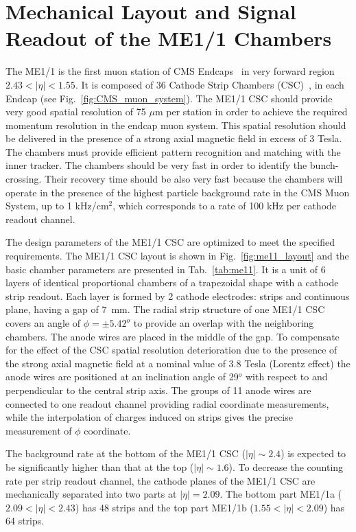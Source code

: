 \section{Mechanical Layout and Signal Readout of the ME1/1 Chambers}
\label{app:me11}

The ME1/1 is the first muon station of CMS Endcaps~\cite{CMS:1997dma} in very forward region $2.43 < |\eta| < 1.55$. It is composed of $36$ Cathode Strip Chambers (CSC)~\cite{Acosta:2000ty, Ershov:2006sf}, in each Endcap (see Fig.~\ref{fig:CMS_muon_system}). The ME1/1 CSC should provide very good spatial resolution of 75 $\mu$m per station in order to achieve the required momentum resolution in the endcap muon system. This spatial resolution should be delivered in the presence of a strong axial magnetic field in excess of 3 Tesla. The chambers must provide efficient pattern recognition and matching with the inner tracker. The chambers should be very fast in order to identify the bunch-crossing. Their recovery time should be also very fast because the chambers will operate in the presence of the highest particle background rate in the CMS Muon System, up to 1 kHz/cm$^2$, which corresponds to a rate of 100 kHz per cathode readout channel.

The design parameters of the ME1/1 CSC are optimized to meet the specified requirements. The ME1/1 CSC layout is shown in Fig.~\ref{fig:me11_layout} and the basic chamber parameters are presented in Tab.~\ref{tab:me11}. It is a unit of 6 layers of identical proportional chambers of a trapezoidal shape with a cathode strip readout. Each layer is formed by 2 cathode electrodes: strips and continuous plane, having a gap of $7$~mm. The radial strip structure of one ME1/1 CSC covers an angle of $\phi = \pm 5.42^{o}$ to provide an overlap with the neighboring chambers. The anode wires are placed in the middle of the gap. To compensate for the effect of the CSC spatial resolution deterioration due to the presence of the strong axial magnetic field at a nominal value of 3.8 Tesla (Lorentz effect) the anode wires are positioned at an inclination angle of 29$^o$ with respect to and perpendicular to the central strip axis. The groups of 11 anode wires are connected to one readout channel providing radial coordinate measurements, while the interpolation of charges induced on strips gives the precise measurement of $\phi$ coordinate.

The background rate at the bottom of the ME1/1 CSC ($|\eta| \sim 2.4$) is expected to be significantly higher than that at the top ($|\eta| \sim 1.6$). To decrease the counting rate per strip readout channel, the cathode planes of the ME1/1 CSC are mechanically separated into two parts at $|\eta| = 2.09$. The bottom part ME1/1a ($2.09 < |\eta| < 2.43$) has 48 strips and the top part ME1/1b ($1.55 < |\eta| < 2.09$) has 64 strips. 

